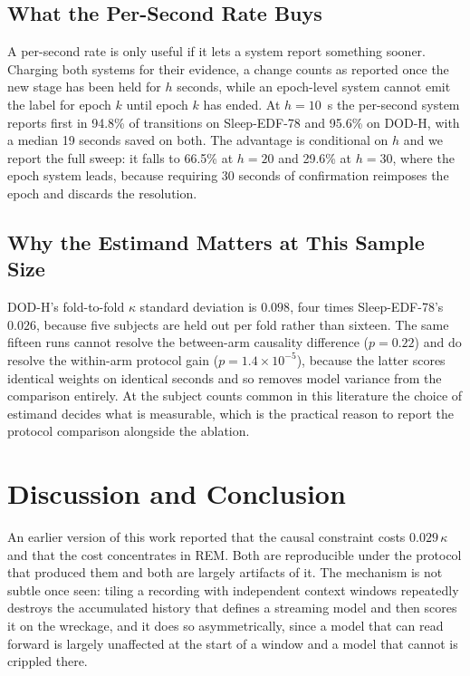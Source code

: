 \documentclass[conference]{IEEEtran}
\begin{document}
\subsection{What the Per-Second Rate Buys}

A per-second rate is only useful if it lets a system report something sooner. Charging both systems
for their evidence, a change counts as reported once the new stage has been held for $h$ seconds,
while an epoch-level system cannot emit the label for epoch $k$ until epoch $k$ has ended. At
$h = 10$~s the per-second system reports first in 94.8\% of transitions on Sleep-EDF-78 and 95.6\%
on DOD-H, with a median 19 seconds saved on both. The advantage is conditional on $h$ and we report
the full sweep: it falls to 66.5\% at $h = 20$ and 29.6\% at $h = 30$, where the epoch system
leads, because requiring 30 seconds of confirmation reimposes the epoch and discards the
resolution.

\subsection{Why the Estimand Matters at This Sample Size}

DOD-H's fold-to-fold $\kappa$ standard deviation is $0.098$, four times Sleep-EDF-78's $0.026$,
because five subjects are held out per fold rather than sixteen. The same fifteen runs cannot
resolve the between-arm causality difference ($p = 0.22$) and do resolve the within-arm protocol
gain ($p = 1.4\times10^{-5}$), because the latter scores identical weights on identical seconds and
so removes model variance from the comparison entirely. At the subject counts common in this
literature the choice of estimand decides what is measurable, which is the practical reason to
report the protocol comparison alongside the ablation.

\section{Discussion and Conclusion}

An earlier version of this work reported that the causal constraint costs $0.029\,\kappa$ and that
the cost concentrates in REM. Both are reproducible under the protocol that produced them and both
are largely artifacts of it. The mechanism is not subtle once seen: tiling a recording with
independent context windows repeatedly destroys the accumulated history that defines a streaming
model and then scores it on the wreckage, and it does so asymmetrically, since a model that can
read forward is largely unaffected at the start of a window and a model that cannot is crippled
there.
\end{document}
